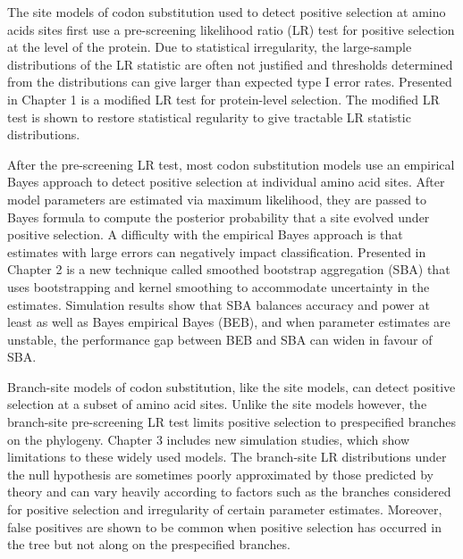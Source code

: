 The site models of codon substitution used to detect positive selection at amino acids sites first use a pre-screening likelihood ratio (LR) test for positive selection at the level of the protein.  Due to statistical irregularity, the large-sample distributions of the LR statistic are often not justified and thresholds determined from the distributions can give larger than expected type I error rates.  Presented in Chapter 1 is a modified LR test for protein-level selection.  The modified LR test is shown to restore statistical regularity to give tractable LR statistic distributions.

After the pre-screening LR test, most codon substitution models use an empirical Bayes approach to detect positive selection at individual amino acid sites.  After model parameters are estimated via maximum likelihood, they are passed to Bayes formula to compute the posterior probability that a site evolved under positive selection.  A difficulty with the empirical Bayes approach is that estimates with large errors can negatively impact classification.  Presented in Chapter 2 is a new technique called smoothed bootstrap aggregation (SBA) that uses bootstrapping and kernel smoothing to accommodate uncertainty in the estimates.   Simulation results show that SBA balances accuracy and power at least as well as Bayes empirical Bayes (BEB), and when parameter estimates are unstable, the performance gap between BEB and SBA can widen in favour of SBA.

Branch-site models of codon substitution, like the site models, can detect positive selection at a subset of amino acid sites.  Unlike the site models however, the branch-site pre-screening LR test limits positive selection to prespecified branches on the phylogeny.  Chapter 3 includes new simulation studies, which show limitations to these widely used models.  The branch-site LR distributions under the null hypothesis are sometimes poorly approximated by those predicted by theory and can vary heavily according to factors such as the branches considered for positive selection and irregularity of certain parameter estimates.  Moreover, false positives are shown to be common when positive selection has occurred in the tree but not along on the prespecified branches.

